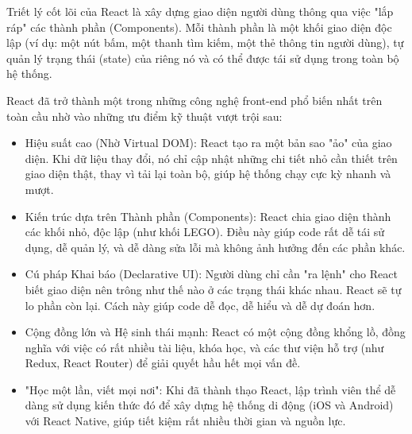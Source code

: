 Triết lý cốt lõi của React là xây dựng giao diện người dùng thông qua việc "lắp ráp" các thành phần (Components). Mỗi thành phần là một khối giao diện độc lập (ví dụ: một nút bấm, một thanh tìm kiếm, một thẻ thông tin người dùng), tự quản lý trạng thái (state) của riêng nó và có thể được tái sử dụng trong toàn bộ hệ thống.

React đã trở thành một trong những công nghệ front-end phổ biến nhất trên toàn cầu nhờ vào những ưu điểm kỹ thuật vượt trội sau:
\begin{itemize}
    \item[-] Hiệu suất cao (Nhờ Virtual DOM): React tạo ra một bản sao "ảo" của giao diện. Khi dữ liệu thay đổi, nó chỉ cập nhật những chi tiết nhỏ cần thiết trên giao diện thật, thay vì tải lại toàn bộ, giúp hệ thống chạy cực kỳ nhanh và mượt.
    \item[-] Kiến trúc dựa trên Thành phần (Components): React chia giao diện thành các khối nhỏ, độc lập (như khối LEGO). Điều này giúp code rất dễ tái sử dụng, dễ quản lý, và dễ dàng sửa lỗi mà không ảnh hưởng đến các phần khác.
    \item[-] Cú pháp Khai báo (Declarative UI): Người dùng chỉ cần "ra lệnh" cho React biết giao diện nên trông như thế nào ở các trạng thái khác nhau. React sẽ tự lo phần còn lại. Cách này giúp code dễ đọc, dễ hiểu và dễ dự đoán hơn.
    \item[-] Cộng đồng lớn và Hệ sinh thái mạnh: React có một cộng đồng khổng lồ, đồng nghĩa với việc có rất nhiều tài liệu, khóa học, và các thư viện hỗ trợ (như Redux, React Router) để giải quyết hầu hết mọi vấn đề.
    \item[-] "Học một lần, viết mọi nơi": Khi đã thành thạo React, lập trình viên thể dễ dàng sử dụng kiến thức đó để xây dựng hệ thống di động (iOS và Android) với React Native, giúp tiết kiệm rất nhiều thời gian và nguồn lực.
\end{itemize}
